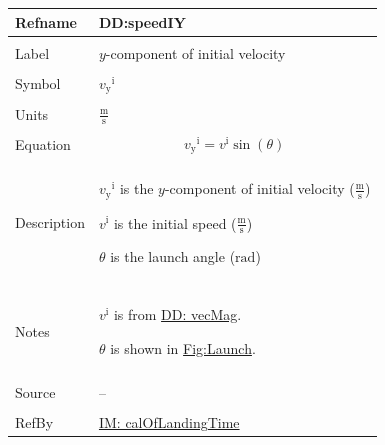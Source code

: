 \documentclass[12pt]{article}
\begin{document}
\vspace{\baselineskip}
\noindent
\begin{minipage}{\textwidth}
\begin{tabular}{>{\raggedright}p{}>{\raggedright\arraybackslash}p{}}
\toprule \textbf{Refname} & \textbf{DD:speedIY}
\label{DD:speedIY}
\\ \midrule \\
Label & $y$-component of initial velocity
        
\\ \midrule \\
Symbol & ${{v_{\text{y}}}^{\text{i}}}$
         
\\ \midrule \\
Units & $\frac{\text{m}}{\text{s}}$
        
\\ \midrule \\
Equation & \begin{displaymath}
           {{v_{\text{y}}}^{\text{i}}}={v^{\text{i}}} \sin\left(θ\right)
           \end{displaymath}
\\ \midrule \\
Description & \begin{symbDescription}
              \item{${{v_{\text{y}}}^{\text{i}}}$ is the $y$-component of initial velocity ($\frac{\text{m}}{\text{s}}$)}
              \item{${v^{\text{i}}}$ is the initial speed ($\frac{\text{m}}{\text{s}}$)}
              \item{$θ$ is the launch angle (${\text{rad}}$)}
              \end{symbDescription}
\\ \midrule \\
Notes & ${v^{\text{i}}}$ is from \hyperref[DD:vecMag]{DD: vecMag}.
        
        $θ$ is shown in \hyperref[Figure:Launch]{Fig:Launch}.
        
\\ \midrule \\
Source & --
         
\\ \midrule \\
RefBy & \hyperref[IM:calOfLandingTime]{IM: calOfLandingTime}
        
\\ \bottomrule
\end{tabular}
\end{minipage}
\end{document}
